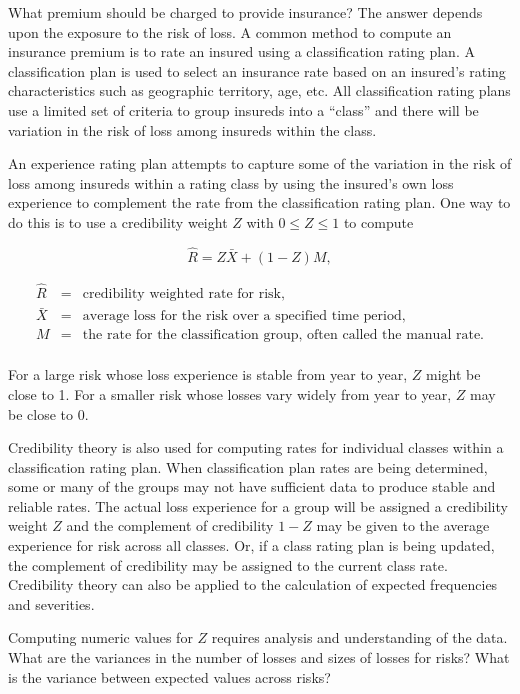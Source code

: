 \documentclass[]{book}
\theoremstyle{definition}
\theoremstyle{definition}
\theoremstyle{definition}
\theoremstyle{remark}
\begin{document}
What premium should be charged to provide insurance? The answer depends
upon the exposure to the risk of loss. A common method to compute an
insurance premium is to rate an insured using a classification rating
plan. A classification plan is used to select an insurance rate based on
an insured's rating characteristics such as geographic territory, age,
etc. All classification rating plans use a limited set of criteria to
group insureds into a ``class'' and there will be variation in the risk
of loss among insureds within the class.

An experience rating plan attempts to capture some of the variation in
the risk of loss among insureds within a rating class by using the
insured's own loss experience to complement the rate from the
classification rating plan. One way to do this is to use a credibility
weight \(Z\) with \(0\leq Z \leq 1\) to compute

\begin{equation*} 
\hat{R}=Z\bar{X}+(1-Z)M,
\end{equation*}

\begin{eqnarray*}
\hat{R}&=&\textrm{credibility weighted rate for risk,}\\
           \bar{X}&=&\textrm{average loss for the risk over a specified time period,}\\
                  M&=&\textrm{the rate for the classification group, often called the manual rate.}\\
\end{eqnarray*}

For a large risk whose loss experience is stable from year to year,
\(Z\) might be close to 1. For a smaller risk whose losses vary widely
from year to year, \(Z\) may be close to 0.

Credibility theory is also used for computing rates for individual
classes within a classification rating plan. When classification plan
rates are being determined, some or many of the groups may not have
sufficient data to produce stable and reliable rates. The actual loss
experience for a group will be assigned a credibility weight \(Z\) and
the complement of credibility \(1-Z\) may be given to the average
experience for risk across all classes. Or, if a class rating plan is
being updated, the complement of credibility may be assigned to the
current class rate. Credibility theory can also be applied to the
calculation of expected frequencies and severities.

Computing numeric values for \(Z\) requires analysis and understanding
of the data. What are the variances in the number of losses and sizes of
losses for risks? What is the variance between expected values across
risks?
\end{document}
